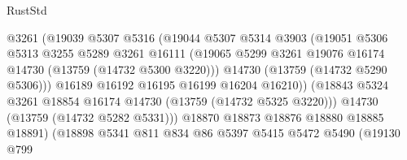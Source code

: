 \begin{lexlean}{RustStd}
\begin{coremodule}
                                    @3261
                                    (@19039
                                      @5307
                                      @5316
                                      (@19044
                                        @5307
                                        @5314
                                        @3903
                                        (@19051
                                          @5306
                                          @5313
                                          @3255
                                          @5289
                                          @3261
                                          @16111
                                          (@19065
                                            @5299
                                            @3261
                                            @19076
                                            @16174
                                            @14730
                                            (@13759 (@14732 @5300 @3220)))
                                          @14730
                                          (@13759 (@14732 @5290 @5306)))
                                        @16189
                                        @16192
                                        @16195
                                        @16199
                                        @16204
                                        @16210))
                                    (@18843
                                      @5324
                                      @3261
                                      @18854
                                      @16174
                                      @14730
                                      (@13759 (@14732 @5325 @3220)))
                                    @14730
                                    (@13759 (@14732 @5282 @5331)))
                                  @18870
                                  @18873
                                  @18876
                                  @18880
                                  @18885
                                  @18891)
                                (@18898
                                  @5341
                                  @811
                                  @834
                                  @86
                                  @5397
                                  @5415
                                  @5472
                                  @5490
                                  (@19130
                                    @799

\end{coremodule}
\end{lexlean}

